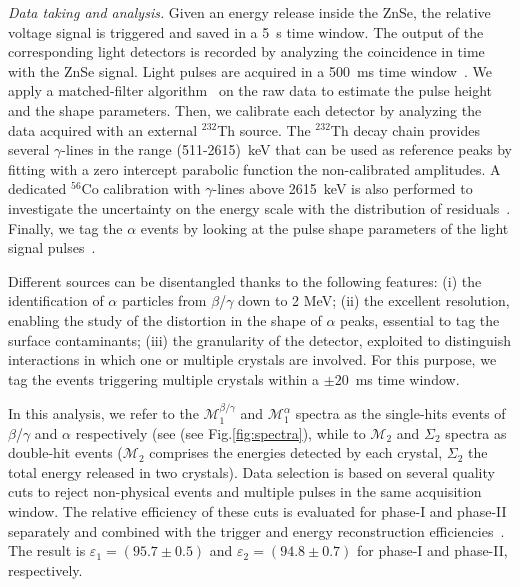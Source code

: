 \documentclass[%
reprint,
superscriptaddress,
altaffilletter,
showpacs,
showkeys,
amsmath, amssymb, aps,prl, floatfix,
]{revtex4-1}
\newcommand{\mspeconea}{$\mathcal{M}^{\alpha}_{1}$\xspace}
\newcommand{\mspeconeb}{$\mathcal{M}^{\beta/\gamma}_{1}$\xspace}
\newcommand{\mspectwo}{$\mathcal{M}_2$\xspace}
\newcommand{\summspectwo}{$\Sigma_2$\xspace}
\newcommand{\phone}{phase-I\xspace}
\newcommand{\phtwo}{phase-II\xspace}
\begin{document}
{\it Data taking and analysis.} Given an energy release inside the ZnSe, the relative voltage signal is triggered and saved in a 5~s time window. The output of the corresponding light detectors is recorded by analyzing the coincidence in time with the ZnSe signal. Light pulses are acquired in a 500~ms time window~\cite{DiDomizio:2018ldc}.
We apply a matched-filter algorithm~\cite{Gatti:1986cw} on the raw data to estimate the pulse height and the shape parameters. Then, we calibrate each detector by analyzing the data acquired with an external $^{232}$Th source. The $^{232}$Th decay chain provides several $\gamma$-lines in the range (511-2615)~keV that can be used as reference peaks by fitting with a zero intercept parabolic function the non-calibrated amplitudes. A dedicated $^{56}$Co calibration with $\gamma$-lines above 2615~keV is also performed to investigate the uncertainty on the energy scale with the distribution of residuals~\cite{Azzolini:2019tta}. Finally, we tag the $\alpha$ events by looking at the pulse shape parameters of the light signal pulses~\cite{Azzolini:2018yye}.

Different sources can be disentangled thanks to the following features: (i) the identification of $\alpha$ particles from $\beta$/$\gamma$ down to 2 MeV; (ii) the excellent resolution, enabling the study of the distortion in the shape of $\alpha$ peaks, essential to tag the surface contaminants; (iii) the granularity of the detector, exploited to distinguish interactions in which one or multiple crystals are involved. For this purpose, we tag the events triggering multiple crystals within a $\pm20$~ms time window.

In this analysis, we refer to the \mspeconeb and \mspeconea spectra as the single-hits events of $\beta$/$\gamma$ and $\alpha$ respectively (see (see Fig.\ref{fig:spectra}), while to \mspectwo and \summspectwo spectra as double-hit events (\mspectwo comprises the energies detected by each crystal, \summspectwo the total energy released in two crystals). Data selection is based on several quality cuts to reject non-physical events and multiple pulses in the same acquisition window. 
The relative efficiency of these cuts is evaluated for \phone and \phtwo separately and combined with the trigger and energy reconstruction efficiencies~\cite{Azzolini:2019nmi}. 
The result is $\varepsilon_{1}=(95.7 \pm 0.5)$ and $\varepsilon_{2}=(94.8 \pm 0.7)$ for \phone and \phtwo, respectively.
\end{document}
